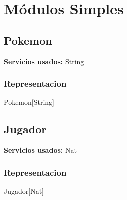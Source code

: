 \section{M\'odulos Simples}

\subsection{Pokemon}

\textbf{Servicios usados:} String

\begin{Representacion}
\subsubsection{Representacion}
	\begin{Estructura}{Pokemon}[String]
	\end{Estructura}
\end{Representacion}


\subsection{Jugador}

\textbf{Servicios usados:} Nat

\begin{Representacion}
\subsubsection{Representacion}
	\begin{Estructura}{Jugador}[Nat]
	\end{Estructura}
\end{Representacion}

